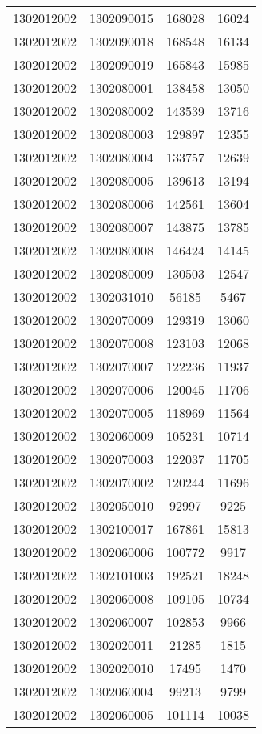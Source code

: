\begin{longtable}[h]{llcc}
		1302012002 & 1302090015 & 168028 & 16024\\
		1302012002 & 1302090018 & 168548 & 16134\\
		1302012002 & 1302090019 & 165843 & 15985\\
		1302012002 & 1302080001 & 138458 & 13050\\
		1302012002 & 1302080002 & 143539 & 13716\\
		1302012002 & 1302080003 & 129897 & 12355\\
		1302012002 & 1302080004 & 133757 & 12639\\
		1302012002 & 1302080005 & 139613 & 13194\\
		1302012002 & 1302080006 & 142561 & 13604\\
		1302012002 & 1302080007 & 143875 & 13785\\
		1302012002 & 1302080008 & 146424 & 14145\\
		1302012002 & 1302080009 & 130503 & 12547\\
		1302012002 & 1302031010 & 56185 & 5467\\
		1302012002 & 1302070009 & 129319 & 13060\\
		1302012002 & 1302070008 & 123103 & 12068\\
		1302012002 & 1302070007 & 122236 & 11937\\
		1302012002 & 1302070006 & 120045 & 11706\\
		1302012002 & 1302070005 & 118969 & 11564\\
		1302012002 & 1302060009 & 105231 & 10714\\
		1302012002 & 1302070003 & 122037 & 11705\\
		1302012002 & 1302070002 & 120244 & 11696\\
		1302012002 & 1302050010 & 92997 & 9225\\
		1302012002 & 1302100017 & 167861 & 15813\\
		1302012002 & 1302060006 & 100772 & 9917\\
		1302012002 & 1302101003 & 192521 & 18248\\
		1302012002 & 1302060008 & 109105 & 10734\\
		1302012002 & 1302060007 & 102853 & 9966\\
		1302012002 & 1302020011 & 21285 & 1815\\
		1302012002 & 1302020010 & 17495 & 1470\\
		1302012002 & 1302060004 & 99213 & 9799\\
		1302012002 & 1302060005 & 101114 & 10038\\

\end{longtable}

